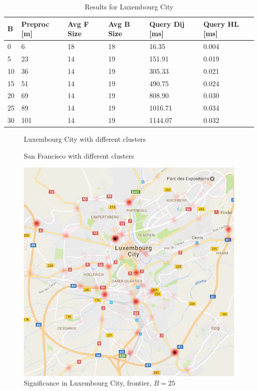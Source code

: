 \begin{table}\caption{Results for Luxembourg City}\label{tab:lu4k_results}
\begin{center}
\begin{tabular}{ | l | p{1cm} | p{1cm} | p{1cm} | p{1.2cm} | p{1.2cm} |}
\hline
	B & Preproc  [m] & Avg F Size & Avg B Size & Query Dij [ms] & Query HL [ms] \\ \hline \hline
	0 & 6 & 18 & 18 & 16.35 & 0.004 \\ \hline
	5 & 23 & 14& 19 & 151.91 & 0.019 \\ \hline
	10 & 36 & 14 & 19 & 305.33 & 0.021 \\ \hline
	15 & 51 & 14& 19 & 490.75 & 0.024 \\ \hline
	20 & 69 & 14 & 19 & 808.90 & 0.030 \\ \hline
	25 & 89 & 14 & 19 & 1016.71 & 0.034 \\ \hline
	30 & 101 & 14& 19 & 1144.07 & 0.032 \\ \hline
\end{tabular}
\end{center}
\end{table}

\begin{figure}\caption{Luxembourg City with different clusters}\label{fig:clusters_lu}
\hfill

\end{figure}

\begin{figure}\caption{San Francisco with different clusters}\label{fig:clusters_sf}
\hfill

\end{figure}


\begin{figure}\caption{Significance in Luxembourg City, frontier, $B=25$}\label{fig:map_LU} 
\begin{center}
\includegraphics[scale=0.37]{TexImg/map_LU_sig.png}
\end{center}
\end{figure}

